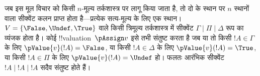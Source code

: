 \documentclass[../../../include/open-logic-section]{subfiles}
\begin{document}
जब इस मूल विचार को किसी $n$-मूल्य तर्कशास्त्र पर लागू किया जाता है, तो दो
के स्थान पर $n$ स्थानों वाला सीक्वेंट कलन प्राप्त होता है---प्रत्येक
सत्य-मूल्य के लिए एक स्थान। $V = \{\False, \Undef, \True\}$ वाले किसी
त्रिमूल्य तर्कशास्त्र में सीक्वेंट $\Gamma \mid \Pi \mid \Delta$ रूप का
व्यंजक होता है। कोई !!{valuation}~$\pAssign v$ इसे तभी संतुष्ट करता है जब या
तो किसी $!A \in \Gamma$ के लिए $\pValue{v}(!A) = \False$, या किसी
$!A \in \Delta$ के लिए $\pValue{v}(!A) = \True$, या किसी $!A \in \Pi$
के लिए $\pValue{v}(!A) = \Undef$ हो। फलतः आरंभिक सीक्वेंट
$!A \mid !A \mid !A$ सदैव संतुष्ट होते हैं।
\end{document}
